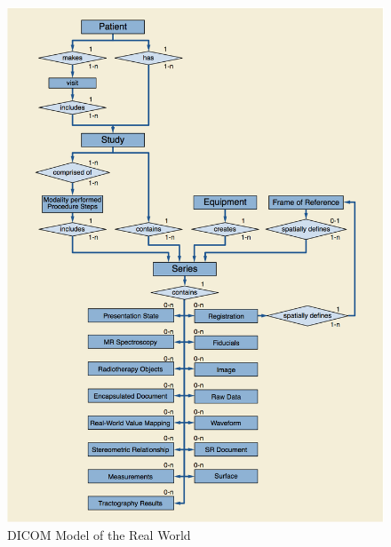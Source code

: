 \begin{figure}[ht]
\centering
\includegraphics[width = 0.83\hsize]{./figures/DICOMRealWorldModel}
\caption{DICOM Model of the Real World}
\end{figure}